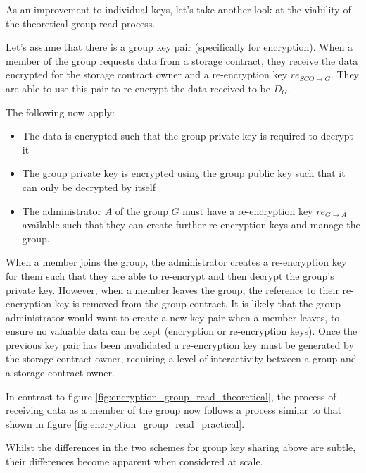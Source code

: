 As an improvement to individual keys, let's take another look at the viability of the theoretical group read process.

Let's assume that there is a group key pair (specifically for encryption). When a member of the group requests data from a storage contract, they receive the data encrypted for the storage contract owner and a re-encryption key $re_{SCO \rightarrow G}$. They are able to use this pair to re-encrypt the data received to be $D_{G}$. 



The following now apply:

\begin{itemize}
  \item The data is encrypted such that the group private key is required to decrypt it
  \item The group private key is encrypted using the group public key such that it can only be decrypted by itself
  \item The administrator $A$ of the group $G$ must have a re-encryption key $re_{G \rightarrow A}$ available such that they can create further re-encryption keys and manage the group.
\end{itemize}

When a member joins the group, the administrator creates a re-encryption key for them such that they are able to re-encrypt and then decrypt the group's private key. However, when a member leaves the group, the reference to their re-encryption key is removed from the group contract. It is likely that the group administrator would want to create a new key pair when a member leaves, to ensure no valuable data can be kept (encryption or re-encryption keys). Once the previous key pair has been invalidated a re-encryption key must be generated by the storage contract owner, requiring a level of interactivity between a group and a storage contract owner.

In contrast to figure \ref{fig:encryption_group_read_theoretical}, the process of receiving data as a member of the group now follows a process similar to that shown in figure \ref{fig:encryption_group_read_practical}.

Whilst the differences in the two schemes for group key sharing above are subtle, their differences become apparent when considered at scale.

